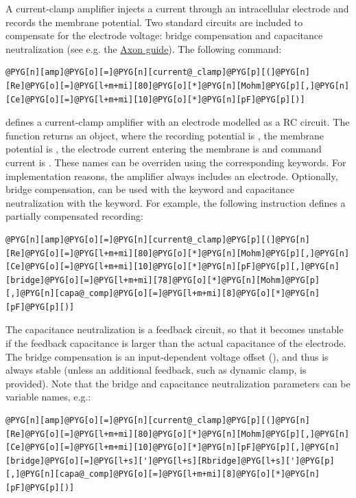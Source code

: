 \documentclass[letterpaper,10pt,english]{manual}
\begin{document}
A current-clamp amplifier injects a current through an intracellular electrode
and records the membrane potential. Two standard circuits are included to compensate
for the electrode voltage: bridge compensation and capacitance neutralization
(see e.g. the \href{http://www.moleculardevices.com/pages/instruments/axon\_guide.html}{Axon guide}).
The following command:

\begin{Verbatim}[commandchars=@\[\]]
@PYG[n][amp]@PYG[o][=]@PYG[n][current@_clamp]@PYG[p][(]@PYG[n][Re]@PYG[o][=]@PYG[l+m+mi][80]@PYG[o][*]@PYG[n][Mohm]@PYG[p][,]@PYG[n][Ce]@PYG[o][=]@PYG[l+m+mi][10]@PYG[o][*]@PYG[n][pF]@PYG[p][)]
\end{Verbatim}

defines a current-clamp amplifier with an electrode modelled as a RC circuit. The function
returns an \hyperlink{brian.Equations}{} object, where
the recording potential is , the membrane potential is , the electrode current
entering the membrane is  and command current is .
These names can be overriden using the corresponding keywords.
For implementation reasons, the amplifier always includes an electrode.
Optionally, bridge compensation, can be used with the  keyword and capacitance
neutralization with the  keyword. For example, the following instruction defines
a partially compensated recording:

\begin{Verbatim}[commandchars=@\[\]]
@PYG[n][amp]@PYG[o][=]@PYG[n][current@_clamp]@PYG[p][(]@PYG[n][Re]@PYG[o][=]@PYG[l+m+mi][80]@PYG[o][*]@PYG[n][Mohm]@PYG[p][,]@PYG[n][Ce]@PYG[o][=]@PYG[l+m+mi][10]@PYG[o][*]@PYG[n][pF]@PYG[p][,]@PYG[n][bridge]@PYG[o][=]@PYG[l+m+mi][78]@PYG[o][*]@PYG[n][Mohm]@PYG[p][,]@PYG[n][capa@_comp]@PYG[o][=]@PYG[l+m+mi][8]@PYG[o][*]@PYG[n][pF]@PYG[p][)]
\end{Verbatim}

The capacitance neutralization is a feedback circuit, so that it becomes unstable if
the feedback capacitance is larger than the actual capacitance of the electrode.
The bridge compensation is an input-dependent voltage offset (), and
thus is always stable (unless an additional feedback, such as dynamic clamp, is provided).
Note that the bridge and capacitance neutralization parameters can be variable names, e.g.:

\begin{Verbatim}[commandchars=@\[\]]
@PYG[n][amp]@PYG[o][=]@PYG[n][current@_clamp]@PYG[p][(]@PYG[n][Re]@PYG[o][=]@PYG[l+m+mi][80]@PYG[o][*]@PYG[n][Mohm]@PYG[p][,]@PYG[n][Ce]@PYG[o][=]@PYG[l+m+mi][10]@PYG[o][*]@PYG[n][pF]@PYG[p][,]@PYG[n][bridge]@PYG[o][=]@PYG[l+s][']@PYG[l+s][Rbridge]@PYG[l+s][']@PYG[p][,]@PYG[n][capa@_comp]@PYG[o][=]@PYG[l+m+mi][8]@PYG[o][*]@PYG[n][pF]@PYG[p][)]
\end{Verbatim}
\end{document}
